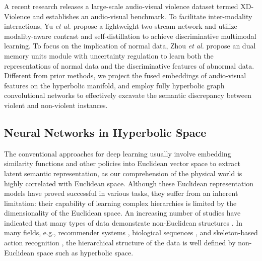 \documentclass[sigconf]{acmart}
\newcommand{\etal}{{\emph{et al. }}}
\begin{document}
A recent research \cite{c:2} releases a large-scale audio-visual violence dataset termed XD-Violence and establishes an audio-visual benchmark. To facilitate inter-modality interactions, Yu \etal \cite{c:4} propose a lightweight two-stream network and utilize modality-aware contrast and self-distillation to achieve discriminative multimodal learning. To focus on the implication of normal data, Zhou \etal \cite{c:10} propose an dual memory units module with uncertainty
regulation to learn both the representations of normal data and the discriminative features of abnormal data. Different from prior methods, we project the fused embeddings of audio-visual features on the hyperbolic manifold, and employ fully hyperbolic graph convolutional networks to effectively excavate the semantic discrepancy between violent and non-violent instances. 




\subsection{Neural Networks in Hyperbolic Space}
The conventional approaches for deep learning usually involve embedding similarity functions and other policies into Euclidean vector space to extract latent semantic representation, as our comprehension of the physical world is highly correlated with Euclidean space. Although these Euclidean representation models have proved successful in various tasks, they suffer from an inherent limitation: their capability of learning complex hierarchies is limited by the dimensionality of the Euclidean space. An increasing number of studies have indicated that many types of data demonstrate non-Euclidean structures \cite{Bronstein2016GeometricDL}. In many fields, e.g., recommender systems \cite{Chen2021ModelingSG}, biological sequences \cite{Corso2021NeuralDE}, and skeleton-based action recognition \cite{Peng2020MixDI}, the hierarchical structure of the data is well defined by non-Euclidean space such as hyperbolic space.
\end{document}
